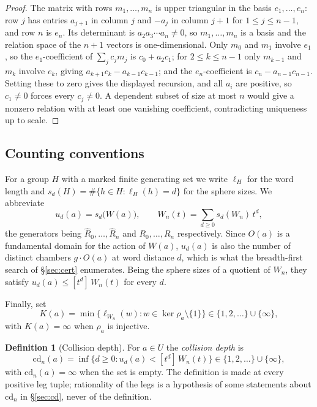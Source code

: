 \documentclass[11pt,a4paper]{article}
\newcommand{\cd}{\mathrm{cd}}
\theoremstyle{definition}
\newtheorem{definition}[theorem]{Definition}
\theoremstyle{remark}
\theoremstyle{plain}
\begin{document}
\begin{proof}
The matrix with rows $m_1,\dots,m_n$ is upper triangular in the basis $e_1,\dots,e_n$: row $j$
has entries $a_{j+1}$ in column $j$ and $-a_j$ in column $j+1$ for $1\le j\le n-1$, and row $n$
is $e_n$. Its determinant is $a_2a_3\cdots a_n\ne0$, so $m_1,\dots,m_n$ is a basis and the
relation space of the $n+1$ vectors is one-dimensional. Only $m_0$ and $m_1$ involve $e_1$, so
the $e_1$-coefficient of $\sum_jc_jm_j$ is $c_0+a_2c_1$; for $2\le k\le n-1$ only $m_{k-1}$ and
$m_k$ involve $e_k$, giving $a_{k+1}c_k-a_{k-1}c_{k-1}$; and the $e_n$-coefficient is
$c_n-a_{n-1}c_{n-1}$. Setting these to zero gives the displayed recursion, and all $a_i$ are
positive, so $c_1\ne0$ forces every $c_j\ne0$. A dependent subset of size at most $n$ would
give a nonzero relation with at least one vanishing coefficient, contradicting uniqueness up to
scale.
\end{proof}

\subsection{Counting conventions}

For a group $H$ with a marked finite generating set we write $\ell_H$ for the word length and
$s_d(H)=\#\{h\in H:\ell_H(h)=d\}$ for the sphere sizes. We abbreviate
\[
u_d(a)=s_d\bigl(W(a)\bigr),\qquad W_n(t)=\sum_{d\ge0}s_d(W_n)\,t^d ,
\]
the generators being $\widehat R_0,\dots,\widehat R_n$ and $R_0,\dots,R_n$ respectively. Since
$O(a)$ is a fundamental domain for the action of $W(a)$, $u_d(a)$ is also the number of distinct
chambers $g\cdot O(a)$ at word distance $d$, which is what the breadth-first search of
\S\ref{sec:cert} enumerates. Being the sphere sizes of a quotient of $W_n$, they satisfy
$u_d(a)\le[t^d]\,W_n(t)$ for every $d$.

Finally, set
\[
K(a)=\min\bigl\{\ell_{W_n}(w):w\in\ker\rho_a\setminus\{1\}\bigr\}\in\{1,2,\dots\}\cup\{\infty\},
\]
with $K(a)=\infty$ when $\rho_a$ is injective.

\begin{definition}[Collision depth]\label{def:cd}
For $a\in U$ the \emph{collision depth} is
\[
\cd_n(a)=\inf\bigl\{d\ge0:u_d(a)<[t^d]\,W_n(t)\bigr\}\in\{1,2,\dots\}\cup\{\infty\},
\]
with $\cd_n(a)=\infty$ when the set is empty. The definition is made at every positive leg
tuple; rationality of the legs is a hypothesis of some statements about $\cd_n$ in
\S\ref{sec:cd}, never of the definition.
\end{definition}
\end{document}
